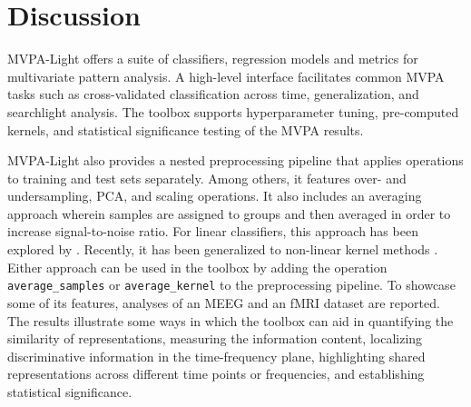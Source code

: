 \documentclass[utf8]{frontiersSCNS} %
\newcommand{\ttt}[1]{\texttt{#1}}
\begin{document}
\section{Discussion}

MVPA-Light offers a suite of classifiers, regression models and metrics for multivariate pattern analysis. A high-level interface facilitates common MVPA tasks such as cross-validated classification across time, generalization, and searchlight analysis. The toolbox supports hyperparameter tuning, pre-computed kernels, and  statistical significance testing of the MVPA results.

MVPA-Light also provides a nested preprocessing pipeline that applies operations to training and test sets separately. Among others, it features over- and undersampling, PCA, and scaling operations. It also includes an averaging approach wherein samples are assigned to groups and then averaged in order to increase signal-to-noise ratio. For linear classifiers, this approach has been explored by \citep{Cichy2015,Cichy2017MultivariateSpace}. Recently, it has been generalized to non-linear kernel methods \citep{Treder2018}. Either approach can be used in the toolbox by adding the operation \ttt{average\_samples} or \ttt{average\_kernel} to the preprocessing pipeline.
To showcase some of its features, analyses of an MEEG \citep{Wakeman2015ADataset} and an fMRI \citep{Haxby2001} dataset are reported. The results illustrate some ways in which the toolbox can aid in quantifying the similarity of representations, measuring the information content, localizing discriminative information in the time-frequency plane, highlighting shared representations across different time points or frequencies, and establishing statistical significance.
\end{document}
